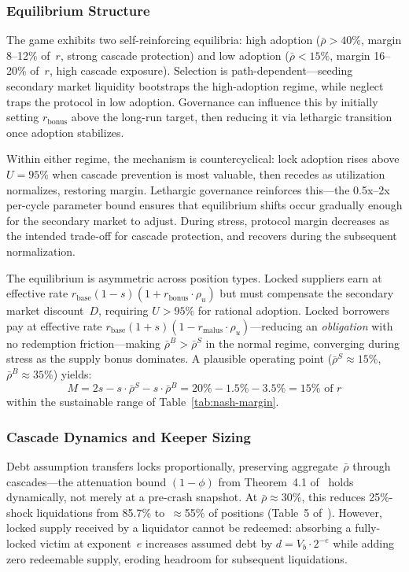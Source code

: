 \documentclass[10pt,a4paper,twocolumn]{article}
\begin{document}
\subsubsection{Equilibrium Structure}

The game exhibits two self-reinforcing equilibria: high adoption ($\bar{\rho} > 40\%$, margin 8--12\% of~$r$, strong cascade protection) and low adoption ($\bar{\rho} < 15\%$, margin 16--20\% of~$r$, high cascade exposure). Selection is path-dependent---seeding secondary market liquidity bootstraps the high-adoption regime, while neglect traps the protocol in low adoption. Governance can influence this by initially setting $r_{\text{bonus}}$ above the long-run target, then reducing it via lethargic transition once adoption stabilizes.

Within either regime, the mechanism is countercyclical: lock adoption rises above $U = 95\%$ when cascade prevention is most valuable, then recedes as utilization normalizes, restoring margin. Lethargic governance reinforces this---the 0.5x--2x per-cycle parameter bound ensures that equilibrium shifts occur gradually enough for the secondary market to adjust. During stress, protocol margin decreases as the intended trade-off for cascade protection, and recovers during the subsequent normalization.

The equilibrium is asymmetric across position types. Locked suppliers earn at effective rate $r_{\text{base}}(1{-}s)(1{+}r_{\text{bonus}} \cdot \rho_u)$ but must compensate the secondary market discount~$D$, requiring $U > 95\%$ for rational adoption. Locked borrowers pay at effective rate $r_{\text{base}}(1{+}s)(1{-}r_{\text{malus}} \cdot \rho_u)$---reducing an \emph{obligation} with no redemption friction---making $\bar{\rho}^B > \bar{\rho}^S$ in the normal regime, converging during stress as the supply bonus dominates. A plausible operating point ($\bar{\rho}^S \approx 15\%$, $\bar{\rho}^B \approx 35\%$) yields:
\begin{equation}
M = 2s - s \cdot \bar{\rho}^S - s \cdot \bar{\rho}^B = 20\% - 1.5\% - 3.5\% = 15\% \text{ of } r
\end{equation}
within the sustainable range of Table~\ref{tab:nash-margin}.

\subsubsection{Cascade Dynamics and Keeper Sizing}

Debt assumption transfers locks proportionally, preserving aggregate~$\bar{\rho}$ through cascades---the attenuation bound $(1{-}\phi)$ from Theorem~4.1 of~\cite{wp} holds dynamically, not merely at a pre-crash snapshot. At $\bar{\rho} \approx 30\%$, this reduces 25\%-shock liquidations from 85.7\% to~$\approx$55\% of positions (Table~5 of~\cite{wp}). However, locked supply received by a liquidator cannot be redeemed: absorbing a fully-locked victim at exponent~$e$ increases assumed debt by $d = V_b \cdot 2^{-e}$ while adding zero redeemable supply, eroding headroom for subsequent liquidations.
\end{document}
